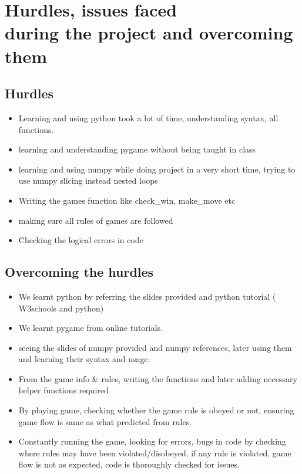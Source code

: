 \documentclass[12pt,letterpaper]{article}
\begin{document}
\section{Hurdles, issues faced \\during the project and overcoming them}
\subsection{Hurdles}
\begin{itemize}
    \item Learning and using python took a lot of time, understanding syntax, all functions. 
    \item learning and understanding pygame without being taught in class 
    \item learning and using numpy while doing project in a very short time, trying to use numpy slicing instead nested loops
    \item Writing the games function like check\_win, make\_move etc
    \item making sure all rules of games are followed
    \item Checking the logical errors in code 
\end{itemize}
\subsection{Overcoming the hurdles}
\begin{itemize}
    \item We learnt python by referring the slides provided and python tutorial ( W3schools\cite{w3schools_python_reference}\cite{w3schools_python_tutorial} and python\cite{python_tutorial})
    \item We learnt pygame from online tutorials.\cite{pygame_docs}
    \item seeing the slides of numpy provided and numpy references, later using them and learning their syntax and usage.\cite{w3schools_numpy_tutorial}\cite{w3schools_numpy_reference}\cite{numpy_docs}
    \item From the game info \& rules, writing the functions and later adding necessary helper functions required
    \item By playing game, checking whether the game rule is obeyed or not, ensuring game flow is same as what predicted from rules.
    \item Constantly running the game, looking for errors, bugs in code by checking where rules may have been violated/disobeyed, if any rule is violated, game flow is not as expected, code is thoroughly checked for issues. 
\end{itemize}
\end{document}
